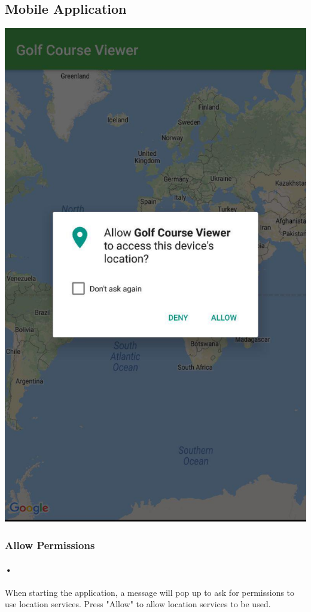 \documentclass{article}
\begin{document}
	\subsection{Mobile Application}
	    \includegraphics[scale=0.2]{mobileapp-permissions.jpg}
	\subsubsection{Allow Permissions}
	
	\paragraph{•}
	When starting the application, a message will pop up to ask for permissions to use location services. Press "Allow" to allow location services to be used.
	
\end{document}

